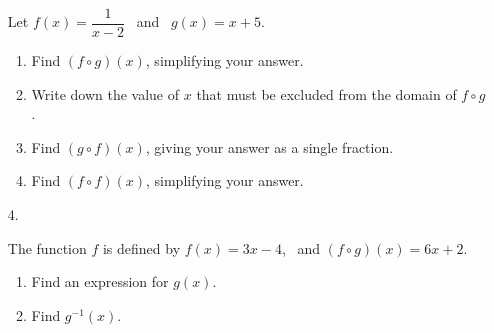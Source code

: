 \documentclass[12pt, twoside]{article}
\begin{document}
\begin{enumerate}[itemsep=0.15cm]
Let $f(x) = \dfrac{1}{x - 2}$ \ and \ $g(x) = x + 5$.

\begin{enumerate}[itemsep=0.15cm]
  \item Find $(f \circ g)(x)$, simplifying your answer. \vfill
  \item Write down the value of $x$ that must be excluded from the domain of $f \circ g$. \vfill
  \item Find $(g \circ f)(x)$, giving your answer as a single fraction. \vfill
  \item Find $(f \circ f)(x)$, simplifying your answer. \vfill
\end{enumerate}

\newpage

\item[4.]

The function $f$ is defined by $f(x) = 3x - 4$, \ and $(f \circ g)(x) = 6x + 2$.

\begin{enumerate}[itemsep=0.15cm]
  \item Find an expression for $g(x)$. \vfill
  \item Find $g^{-1}(x)$. \vfill
\end{enumerate}

\end{enumerate}
\end{document}
